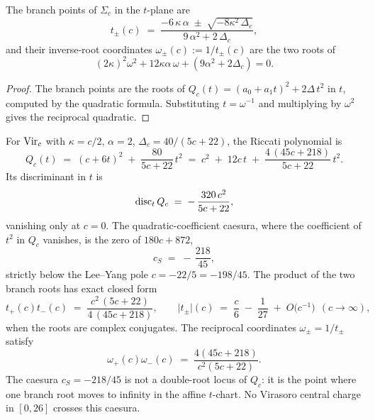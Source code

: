 \begin{corollary}
\label{cor:branch-points-instantons}
\ClaimStatusProvedHere
The branch points of $\Sigma_c$ in the $t$-plane are
\[
t_\pm(c) \;=\;
\frac{-6\,\kappa\,\alpha \;\pm\; \sqrt{-8\kappa^{2}\,\Delta_c}}
 {9\,\alpha^{2} + 2\,\Delta_c},
\]
and their inverse-root coordinates
$\omega_\pm(c):=1/t_\pm(c)$ are the two roots of
\[
(2\kappa)^2\omega^2+12\kappa\alpha\,\omega+
(9\alpha^2+2\Delta_c)=0.
\]
\end{corollary}

\begin{proof}
The branch points are the roots of $Q_c(t) = (a_0 + a_1 t)^{2} +
2\Delta\,t^{2}$ in $t$, computed by the quadratic formula. Substituting
$t=\omega^{-1}$ and multiplying by $\omega^2$ gives the reciprocal
quadratic.
\end{proof}

\begin{theorem}
\label{thm:stokes-line-c-S}
\ClaimStatusProvedHere
For $\mathrm{Vir}_c$ with $\kappa = c/2$, $\alpha = 2$, $\Delta_c = 40/(5c+22)$,
the Riccati polynomial is
\[
Q_c(t) \;=\; (c + 6 t)^{2} \;+\; \frac{80}{5c+22}\,t^{2}
\;=\; c^{2} \;+\; 12 c\,t \;+\; \frac{4\,(45 c + 218)}{5c+22}\,t^{2}.
\]
Its discriminant in $t$ is
\[
\operatorname{disc}_t Q_c \;=\; -\,\frac{320\,c^{2}}{5c+22},
\]
vanishing only at $c = 0$. The quadratic-coefficient caesura, where
the coefficient of $t^{2}$ in $Q_c$ vanishes, is the zero of
$180 c + 872$,
\[
c_S \;=\; -\,\frac{218}{45},
\]
strictly below the Lee--Yang pole $c = -22/5 = -198/45$. The product
of the two branch roots has exact closed form
\begin{equation}
\label{eq:borel-radius-closed}
t_+(c)t_-(c)
\;=\; \frac{c^{2}\,(5c+22)}{4\,(45 c + 218)},
\qquad
\lvert t_\pm\rvert(c)
\;=\; \frac{c}{6}\;-\;\frac{1}{27}\;+\;O\!\bigl(c^{-1}\bigr)\ \ (c\to\infty),
\end{equation}
when the roots are complex conjugates. The reciprocal coordinates
$\omega_\pm=1/t_\pm$ satisfy
\[
\omega_+(c)\omega_-(c)
\;=\;\frac{4(45c+218)}{c^2(5c+22)}.
\]
The caesura $c_S=-218/45$ is not a double-root locus of $Q_c$: it is
the point where one branch root moves to infinity in the affine
$t$-chart. No Virasoro central charge in $[0,26]$ crosses this
caesura.
\end{theorem}

